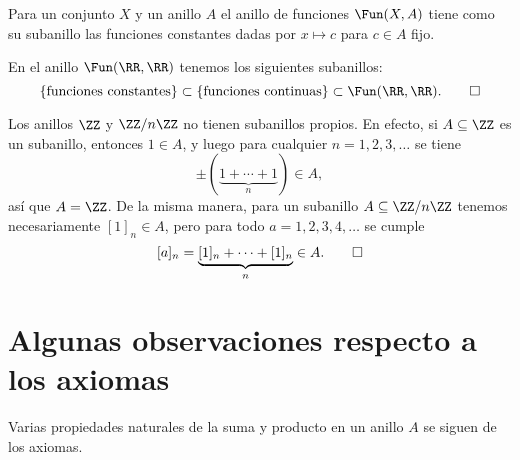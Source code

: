 \begin{ejemplo}
  Para un conjunto $X$ y un anillo $A$ el anillo de funciones $\Fun (X,A)$ tiene
  como su subanillo las funciones constantes dadas por $x \mapsto c$ para
  $c\in A$ fijo.

  En el anillo $\Fun (\RR,\RR)$ tenemos los siguientes subanillos:
  \[ \{ \text{funciones constantes} \} \subset
    \{ \text{funciones continuas} \} \subset
    \Fun (\RR,\RR). \qedhere \]
\end{ejemplo}

\begin{ejemplo}
  Los anillos $\ZZ$ y $\ZZ/n\ZZ$ no tienen subanillos propios. En efecto, si
  $A \subseteq \ZZ$ es un subanillo, entonces $1 \in A$, y luego para cualquier
  $n = 1,2,3,\ldots$ se tiene
  $$\pm (\underbrace{1 + \cdots + 1}_n) \in A,$$
  así que $A = \ZZ$. De la misma manera, para un subanillo
  $A \subseteq \ZZ/n\ZZ$ tenemos necesariamente $[1]_n \in A$, pero para todo
  $a = 1,2,3,4,\ldots$ se cumple
  \[ [a]_n = \underbrace{[1]_n + \cdots + [1]_n}_n \in A. \qedhere \]
\end{ejemplo}


\section{Algunas observaciones respecto a los axiomas}

Varias propiedades naturales de la suma y producto en un anillo $A$ se siguen de
los axiomas.


